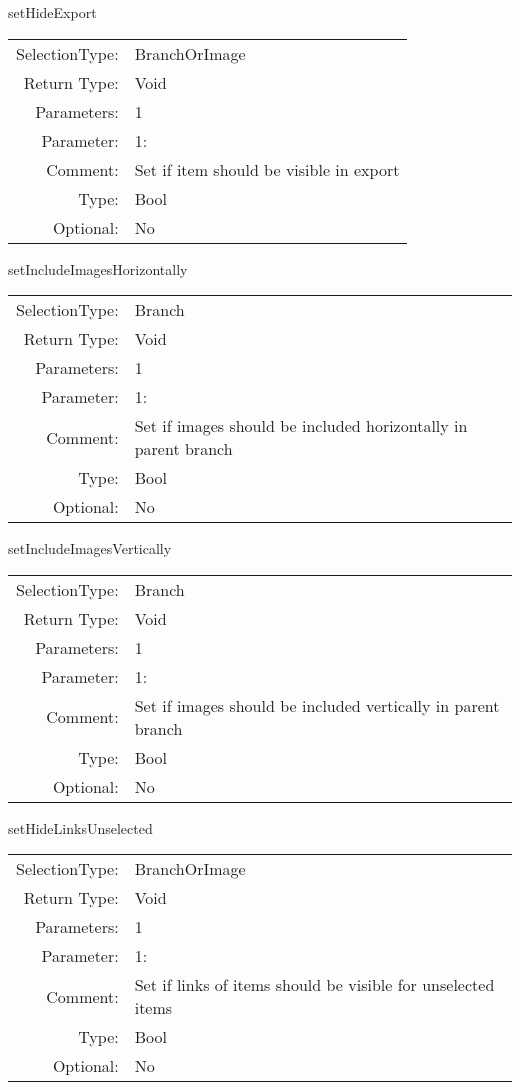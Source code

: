 \item setHideExport\\
\begin{tabular}{rl}
  SelectionType: & BranchOrImage\\
    Return Type: & Void\\
     Parameters: & 1\\
   Parameter: &  1:\\
        Comment: & Set if item should be visible in export\\
           Type: & Bool\\
       Optional: &  No\\
\end{tabular}

\item setIncludeImagesHorizontally\\
\begin{tabular}{rl}
  SelectionType: & Branch\\
    Return Type: & Void\\
     Parameters: & 1\\
   Parameter: &  1:\\
        Comment: & Set if images should be included horizontally in parent branch\\
           Type: & Bool\\
       Optional: &  No\\
\end{tabular}

\item setIncludeImagesVertically\\
\begin{tabular}{rl}
  SelectionType: & Branch\\
    Return Type: & Void\\
     Parameters: & 1\\
   Parameter: &  1:\\
        Comment: & Set if images should be included vertically in parent branch\\
           Type: & Bool\\
       Optional: &  No\\
\end{tabular}

\item setHideLinksUnselected\\
\begin{tabular}{rl}
  SelectionType: & BranchOrImage\\
    Return Type: & Void\\
     Parameters: & 1\\
   Parameter: &  1:\\
        Comment: & Set if links of items should be visible for unselected items\\
           Type: & Bool\\
       Optional: &  No\\
\end{tabular}

